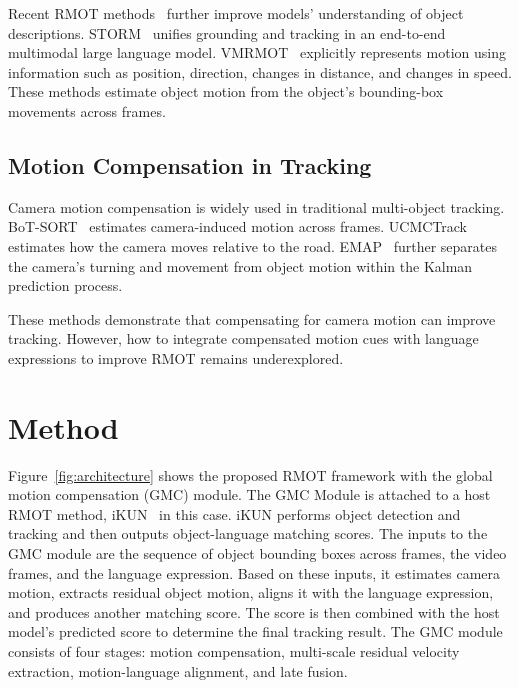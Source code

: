 \documentclass{article}
\begin{document}
Recent RMOT methods~\cite{deeprmot} further improve models' understanding of object descriptions. STORM~\cite{storm} unifies grounding and tracking in an end-to-end multimodal large language model. VMRMOT~\cite{vmrmot} explicitly represents motion using information such as position, direction, changes in distance, and changes in speed. These methods estimate object motion from the object's bounding-box movements across frames.

\subsection{Motion Compensation in Tracking}
Camera motion compensation is widely used in traditional multi-object tracking. BoT-SORT~\cite{botsort} estimates camera-induced motion across frames. UCMCTrack~\cite{ucmctrack} estimates how the camera moves relative to the road. EMAP~\cite{emap} further separates the camera's turning and movement from object motion within the Kalman prediction process.

These methods demonstrate that compensating for camera motion can improve tracking. However, how to integrate compensated motion cues with language expressions to improve RMOT remains underexplored.



\section{Method}
\label{sec:method}
Figure~\ref{fig:architecture} shows the proposed RMOT framework with the global motion compensation (GMC) module. The GMC Module is attached to a host RMOT method, iKUN~\cite{ikun} in this case. iKUN performs object detection and tracking and then outputs object-language matching scores. The inputs to the GMC module are the sequence of object bounding boxes across frames, the video frames, and the language expression. Based on these inputs, it estimates camera motion, extracts residual object motion, aligns it with the language expression, and produces another matching score. The score is then combined with the host model's predicted score to determine the final tracking result. The GMC module consists of four stages: motion compensation, multi-scale residual velocity extraction, motion-language alignment, and late fusion.
\end{document}
